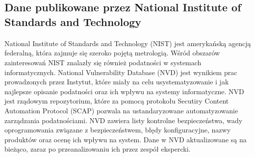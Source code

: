 \documentclass[a4paper,12pt,twoside]{article}
\begin{document}
\subsection{Dane publikowane przez National Institute of Standards and Technology}
\paragraph{}
National Institute of Standards and Technology (NIST) jest amerykańską agencją federalną, która zajmuje się szeroko pojętą metrologią. Wśród obszarów zainteresowań NIST znalazły się również podatności w systemach informatycznych\cite{nist_official}. National Vulnerability Database (NVD) jest wynikiem prac prowadzonych przez Instytut, które miały na celu usystematyzowanie i jak najlepsze opisanie podatności oraz ich wpływu na systemy informatyczne. NVD jest rządowym repozytorium, które za pomocą protokołu Secutiry Content Automation Protocol (SCAP) pozwala na ustandaryzowane automatyzowanie zarządzania podatnościami. NVD zawiera listy kontrolne bezpieczeństwa, wady oprogramowania związane z bezpieczeństwem, błędy konfiguracyjne, nazwy produktów oraz ocenę ich wpływu na system. Dane w NVD aktualizowane są na bieżąco, zaraz po przeanalizowaniu ich przez zespół ekspercki\cite{nvd_official}. 
\end{document}

